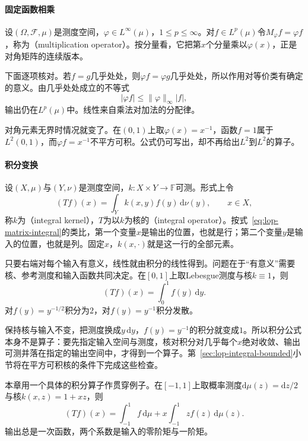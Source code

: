 \paragraph{固定函数相乘}
设$(\Omega,\mathcal F,\mu)$是测度空间，$\varphi\in L^\infty(\mu)$，$1\leq p\leq\infty$。对$f\in L^p(\mu)$令$M_\varphi f=\varphi f$，称为（multiplication operator）。按分量看，它把第$x$个分量乘以$\varphi(x)$，正是对角矩阵的连续版本。

下面逐项核对。若$f=g$几乎处处，则$\varphi f=\varphi g$几乎处处，所以作用对等价类有确定的意义。由几乎处处成立的不等式
\[
 \lvert\varphi f\rvert\leq\lVert\varphi\rVert_\infty\lvert f\rvert,
\]
输出仍在$L^p(\mu)$中。线性来自乘法对加法的分配律。

对角元素无界时情况就变了。在$(0,1)$上取$\varphi(x)=x^{-1}$，函数$f=1$属于$L^2(0,1)$，而$\varphi f=x^{-1}$不平方可积。公式仍可写出，却不再给出$L^2$到$L^2$的算子。

\paragraph{积分变换}
设$(X,\mu)$与$(Y,\nu)$是测度空间，$k:X\times Y\to\mathbb F$可测。形式上令
\begin{equation}
 (Tf)(x)=\int_Yk(x,y)f(y)\,\mathrm d\nu(y),\qquad x\in X,
 \label{eq:lop-integral-operator}
\end{equation}
称$k$为（integral kernel），$T$为以$k$为核的（integral operator）。按式~\eqref{eq:lop-matrix-integral}的类比，第一个变量$x$是输出的位置，也就是行；第二个变量$y$是输入的位置，也就是列。固定$x$，$k(x,\cdot)$就是这一行的全部元素。

只要右端对每个输入有意义，线性就由积分的线性得到。问题在于“有意义”需要核、参考测度和输入函数共同决定。在$[0,1]$上取Lebesgue测度与核$k\equiv1$，则
\[
 (Tf)(x)=\int_0^1f(y)\,\mathrm dy.
\]
对$f(y)=y^{-1/2}$积分为$2$，对$f(y)=y^{-1}$积分发散。

保持核与输入不变，把测度换成$y\,\mathrm dy$，$f(y)=y^{-1}$的积分就变成$1$。所以积分公式本身不是算子：要先指定输入空间与测度，核对积分对几乎每个$x$绝对收敛、输出可测并落在指定的输出空间中，才得到一个算子。第~\ref{sec:lop-integral-bounded}小节将在平方可积核的条件下完成这些检查。

本章用一个具体的积分算子作贯穿例子。在$[-1,1]$上取概率测度$\mathrm d\mu(z)=\mathrm dz/2$与核$k(x,z)=1+xz$，则
\begin{equation}
 (Tf)(x)=\int_{-1}^1f\,\mathrm d\mu+x\int_{-1}^1zf(z)\,\mathrm d\mu(z).
 \label{eq:lop-running-kernel}
\end{equation}
输出总是一次函数，两个系数是输入的零阶矩与一阶矩。

